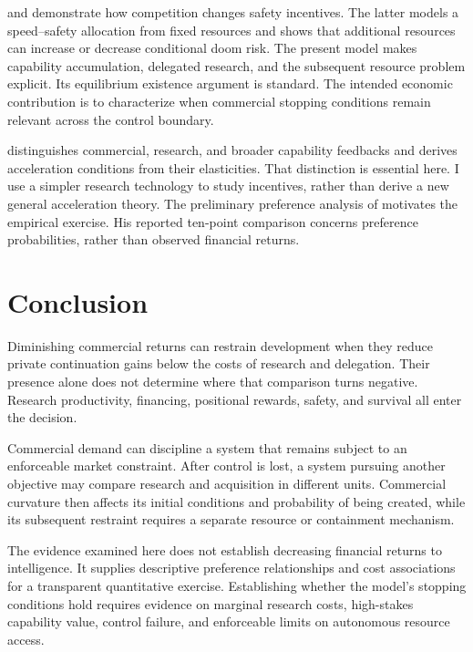 \documentclass[11pt]{article}
\theoremstyle{definition}
\theoremstyle{remark}
\begin{document}
\citet{armstrong2016} and \citet{race2026} demonstrate how competition changes safety incentives. The latter models a speed--safety allocation from fixed resources and shows that additional resources can increase or decrease conditional doom risk. The present model makes capability accumulation, delegated research, and the subsequent resource problem explicit. Its equilibrium existence argument is standard. The intended economic contribution is to characterize when commercial stopping conditions remain relevant across the control boundary.

\citet{cunningham2026} distinguishes commercial, research, and broader capability feedbacks and derives acceleration conditions from their elasticities. That distinction is essential here. I use a simpler research technology to study incentives, rather than derive a new general acceleration theory. The preliminary preference analysis of \citet{fradkin2026} motivates the empirical exercise. His reported ten-point comparison concerns preference probabilities, rather than observed financial returns.



\section{Conclusion}
Diminishing commercial returns can restrain development when they reduce private continuation gains below the costs of research and delegation. Their presence alone does not determine where that comparison turns negative. Research productivity, financing, positional rewards, safety, and survival all enter the decision.

Commercial demand can discipline a system that remains subject to an enforceable market constraint. After control is lost, a system pursuing another objective may compare research and acquisition in different units. Commercial curvature then affects its initial conditions and probability of being created, while its subsequent restraint requires a separate resource or containment mechanism.

The evidence examined here does not establish decreasing financial returns to intelligence. It supplies descriptive preference relationships and cost associations for a transparent quantitative exercise. Establishing whether the model's stopping conditions hold requires evidence on marginal research costs, high-stakes capability value, control failure, and enforceable limits on autonomous resource access.
\clearpage
\appendix




\end{document}
